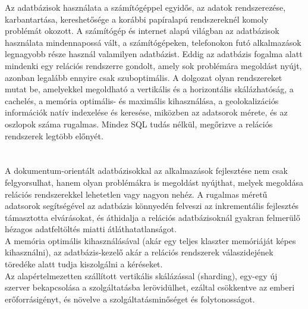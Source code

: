 Az adatbázisok használata a számítógéppel egyidős, az adatok rendszerezése, karbantartása, kereshetősége a korábbi papíralapú rendszereknél komoly problémát okozott. A számítógép és internet alapú világban az adatbázisok használata mindennapossá vált, a számítógépeken, telefonokon futó alkalmazások legnagyobb része használ valamilyen adatbázist. Eddig az adatbázis fogalma alatt mindenki egy relációs rendszerre gondolt, amely sok problémára megoldást nyújt, azonban legalább ennyire csak szuboptimális. A dolgozat olyan rendszereket mutat be, amelyekkel megoldható a vertikális és a horizontális skálázhatóság, a cachelés, a memória optimális- és maximális kihasználása, a geolokalizációs információk natív indexelése és keresése, miközben az adatsorok mérete, és az oszlopok száma rugalmas. Mindez SQL tudás nélkül, megőrizve a relációs rendszerek legtöbb előnyét.\\
\\
\\
A dokumentum-orientált adatbázisokkal az alkalmazások fejlesztése nem csak felgyorsulhat, hanem olyan problémákra is megoldást nyújthat, melyek megoldása relációs rendszerekkel lehetetlen vagy nagyon nehéz. A rugalmas méretű adatsorok segítségével az adatbázis könnyedén felveszi az inkrementális fejlesztés támasztotta elvárásokat, és áthidalja a relációs adatbázisoknál gyakran felmerülő hézagos adatfeltöltés miatti átláthatatlanságot. \\
A memória optimális kihasználásával (akár egy teljes klaszter memóriáját képes kihasználni), az adatbázis-kezelő akár a relációs rendszerek válaszidejének töredéke alatt tudja kiszolgálni a kéréseket.\\
Az alapértelmezetten szállított vertikális skálázással (sharding), egy-egy új szerver bekapcsolása a szolgáltatásba lerövidülhet, ezáltal csökkentve az emberi erőforrásigényt, és növelve a szolgáltatásminőséget és folytonosságot.

